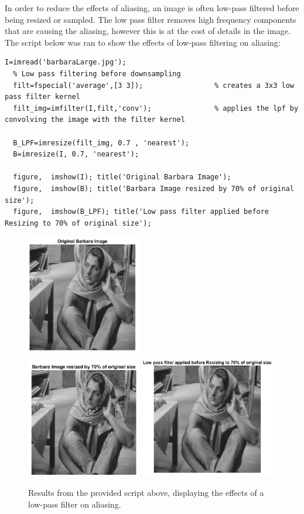 \documentclass[a4paper, 10pt]{article}
\begin{document}
\noindent In order to reduce the effects of aliasing, an image is often low-pass filtered before being resized or sampled.
The low pass filter removes high frequency components that are causing the aliasing, however this is at the cost of
details in the image. The script below was ran to show the effects of low-pass filtering on aliasing:
\begin{lstlisting}[style=Matlab-editor, basicstyle=\small\ttfamily]
  I=imread('barbaraLarge.jpg');
  % Low pass filtering before downsampling
  filt=fspecial('average',[3 3]);                 % creates a 3x3 low pass filter kernel
  filt_img=imfilter(I,filt,'conv');               % applies the lpf by convolving the image with the filter kernel
  
  B_LPF=imresize(filt_img, 0.7 , 'nearest');
  B=imresize(I, 0.7, 'nearest');
  
  figure,  imshow(I); title('Original Barbara Image');
  figure,  imshow(B); title('Barbara Image resized by 70% of original size');
  figure,  imshow(B_LPF); title('Low pass filter applied before Resizing to 70% of original size');
\end{lstlisting}
\begin{figure}[H]
  \centering
  \includegraphics[width=5cm]{images/q4_e1.png} \\
  \includegraphics[width=5cm]{images/q4_e2.png}
  \includegraphics[width=6cm]{images/q4_e3.png}
  \caption{Results from the provided script above, displaying the effects of a low-pass filter on aliasing.}
\end{figure}
\end{document}
